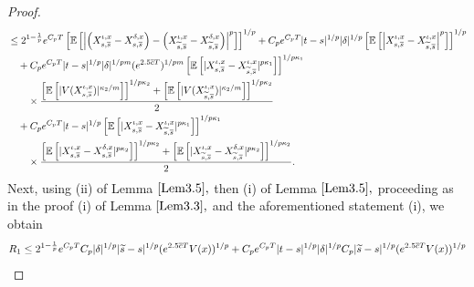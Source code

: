 \documentclass[11pt]{article}
\theoremstyle{theorem}
\theoremstyle{definition}
\newcommand{\1}{{\bf 1}}
\begin{document}
\begin{proof}
\begin{align*}
 & \leq   2^{1-\frac{1}{p}} e^{C_p T} \left[\mathbb{E}\left[\left|\left(X^{\iota, x}_{s,\overline{s}}-X^{\delta,x}_{s,\overline{s}}\right) - \left(X^{\iota, x}_{\widetilde{s},\overline{s}}-X^{\delta, x}_{\widetilde{s},\overline{s}}\right)\right|^p\right]\right]^{1/p}   + C_p e^{C_p T} |t-s|^{1/p} |\delta|^{1/p} \left[\mathbb{E}\left[\left|X^{\iota, x}_{s,\overline{s}}-X^{\iota, x}_{\widetilde{s},\overline{s}}\right|^p\right]\right]^{1/p} \notag\\
& \quad + C_p e^{C_p T} |t-s|^{1/p} |\delta|^{1/pm} (e^{2.5\overline{c}T})^{1/pm} \left[\mathbb{E}\left[|X^{\iota, x}_{s,\overline{s}} - X^{\iota, x}_{\widetilde{s},\overline{s}}|^{p\kappa_1}\right]\right]^{1/p\kappa_1} \notag\\
& \qquad \times  \dfrac{\left[\mathbb{E}\left[|V(X^{\iota, x}_{s,\overline{s}})|^{\kappa_2/m}\right]\right]^{1/p\kappa_2}+\left[\mathbb{E}\left[|V(X^{\iota, x}_{\widetilde{s},\overline{s}})|^{\kappa_2/m}\right]\right]^{1/p\kappa_2}}{2}\notag\\
& \quad + C_p e^{C_p T} |t-s|^{1/p} \left[\mathbb{E}\left[|X^{\iota, x}_{s,\overline{s}} - X^{\iota, x}_{\widetilde{s},\overline{s}}|^{p\kappa_1}\right]\right]^{1/p\kappa_1} \notag\\
  & \quad \quad  \times \dfrac{\left[\mathbb{E}\left[|X^{\iota, x}_{s,\overline{s}} - X^{\delta, x}_{s,\overline{s}}|^{p\kappa_2}\right]\right]^{1/p\kappa_2}+ \left[\mathbb{E}\left[|X^{\iota, x}_{\widetilde{s},\overline{s}} - X^{\delta, x}_{\widetilde{s},\overline{s}}|^{p\kappa_2}\right]\right]^{1/p\kappa_2}}{2}   .
  \end{align*}
Next, using (ii) of Lemma $\ref{Lem3.5},$ then (i) of Lemma $\ref{Lem3.5},$ proceeding as in the
proof (i) of Lemma $\ref{Lem3.3},$ and the aforementioned statement (i), we obtain  
  \begin{align}
R_1 
  & \leq   2^{1-\frac{1}{p}} e^{C_p T}  C_p |\delta|^{1/p} |\widetilde{s} -s|^{1/p} (e^{2.5\overline{c}T}V(x))^{1/p}  + C_p e^{C_p T}   |t-s|^{1/p} |\delta|^{1/p} C_p |\widetilde{s}-s|^{1/p} (e^{2.5\overline{c}T}V(x))^{1/p}  \notag\\

\end{align}
\end{proof}
\end{document}
